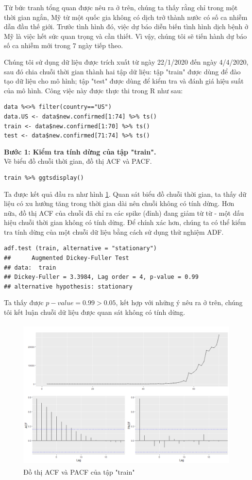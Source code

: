 \documentclass[12pt, a4paper,oneside]{book}
\theoremstyle{definition}
\begin{document}
Từ bức tranh tổng quan được nêu ra ở trên, chúng ta thấy rằng chỉ trong một thời gian ngắn, Mỹ từ một quốc gia không có dịch trở thành nước có số ca nhiễm dẫn đầu thế giới. Trước tình hình đó, việc dự báo diễn biến tình hình dịch bệnh ở Mỹ là việc hết sức quan trọng và cần thiết. Vì vậy, chúng tôi sẽ tiến hành dự báo số ca nhiễm mới trong 7 ngày tiếp theo.

Chúng tôi sử dụng dữ liệu được trích xuất từ ngày 22/1/2020 đến ngày 4/4/2020, sau đó chia chuỗi thời gian thành hai tập dữ liệu: tập "train" được dùng để đào tạo dữ liệu cho mô hình; tập "test" được dùng để kiểm tra và đánh giá hiệu suất của mô hình. Công việc này được thực thi trong R như sau:
\begin{lstlisting}
data %<>% filter(country=="US")
data.US <- data$new.confirmed[1:74] %>% ts()
train <- data$new.confirmed[1:70] %>% ts()
test <- data$new.confirmed[71:74] %>% ts()
\end{lstlisting}
\textbf{Bước 1: Kiểm tra tính dừng của tập "train".}\\
Vẽ biểu đồ chuỗi thời gian, đồ thị ACF và PACF.
\begin{lstlisting}
train %>% ggtsdisplay()
\end{lstlisting}
Ta được kết quả đầu ra như hình \ref{h24}. Quan sát biểu đồ chuỗi thời gian, ta thấy dữ liệu có xu hướng tăng trong thời gian dài nên chuỗi không có tính dừng. Hơn nữa, đồ thị ACF của chuỗi đã chỉ ra các spike (đỉnh) đang giảm từ từ - một dấu hiệu chuỗi thời gian không có tính dừng. Để chính xác hơn, chúng ta có thể kiểm tra tính dừng của một chuỗi dữ liệu bằng cách sử dụng thử nghiệm ADF.
\begin{lstlisting}
adf.test (train, alternative = "stationary")
##  	Augmented Dickey-Fuller Test
## data:  train
## Dickey-Fuller = 3.3984, Lag order = 4, p-value = 0.99
## alternative hypothesis: stationary
\end{lstlisting}
Ta thấy được $p-value = 0.99 > 0.05$, kết hợp với những ý nêu ra ở trên, chúng tôi kết luận chuỗi dữ liệu được quan sát không có tính dừng.\\
\begin{figure}[!htb]
	\centering
	\includegraphics[width=1\linewidth,height=7.7cm]{anh/US1}
	\vskip-4mm 
	\caption{Đồ thị ACF và PACF của tập "train"}  
	\label{h24}
\end{figure}
\end{document}
